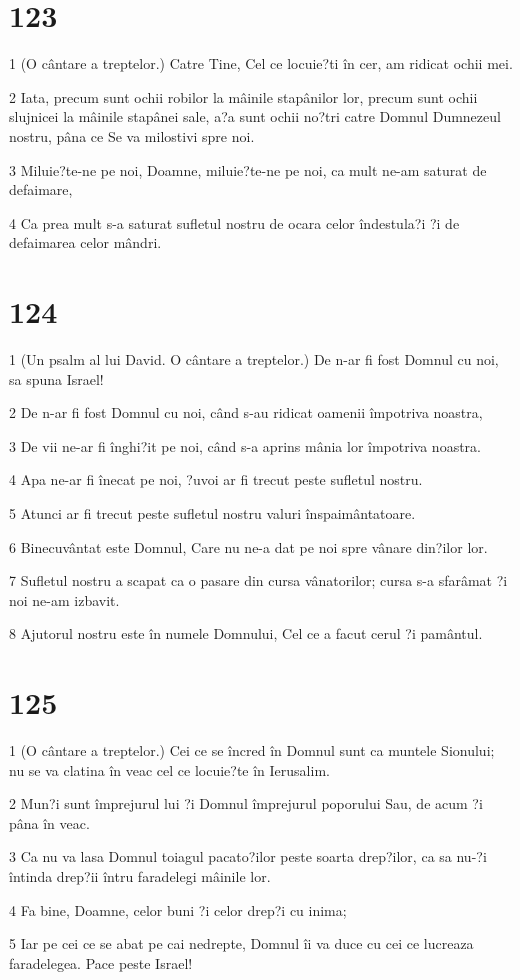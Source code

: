 \chapter{123}

\par 1 (O cântare a treptelor.) Catre Tine, Cel ce locuie?ti în cer, am ridicat ochii mei.
\par 2 Iata, precum sunt ochii robilor la mâinile stapânilor lor, precum sunt ochii slujnicei la mâinile stapânei sale, a?a sunt ochii no?tri catre Domnul Dumnezeul nostru, pâna ce Se va milostivi spre noi.
\par 3 Miluie?te-ne pe noi, Doamne, miluie?te-ne pe noi, ca mult ne-am saturat de defaimare,
\par 4 Ca prea mult s-a saturat sufletul nostru de ocara celor îndestula?i ?i de defaimarea celor mândri.

\chapter{124}

\par 1 (Un psalm al lui David. O cântare a treptelor.) De n-ar fi fost Domnul cu noi, sa spuna Israel!
\par 2 De n-ar fi fost Domnul cu noi, când s-au ridicat oamenii împotriva noastra,
\par 3 De vii ne-ar fi înghi?it pe noi, când s-a aprins mânia lor împotriva noastra.
\par 4 Apa ne-ar fi înecat pe noi, ?uvoi ar fi trecut peste sufletul nostru.
\par 5 Atunci ar fi trecut peste sufletul nostru valuri înspaimântatoare.
\par 6 Binecuvântat este Domnul, Care nu ne-a dat pe noi spre vânare din?ilor lor.
\par 7 Sufletul nostru a scapat ca o pasare din cursa vânatorilor; cursa s-a sfarâmat ?i noi ne-am izbavit.
\par 8 Ajutorul nostru este în numele Domnului, Cel ce a facut cerul ?i pamântul.

\chapter{125}

\par 1 (O cântare a treptelor.) Cei ce se încred în Domnul sunt ca muntele Sionului; nu se va clatina în veac cel ce locuie?te în Ierusalim.
\par 2 Mun?i sunt împrejurul lui ?i Domnul împrejurul poporului Sau, de acum ?i pâna în veac.
\par 3 Ca nu va lasa Domnul toiagul pacato?ilor peste soarta drep?ilor, ca sa nu-?i întinda drep?ii întru faradelegi mâinile lor.
\par 4 Fa bine, Doamne, celor buni ?i celor drep?i cu inima;
\par 5 Iar pe cei ce se abat pe cai nedrepte, Domnul îi va duce cu cei ce lucreaza faradelegea. Pace peste Israel!

